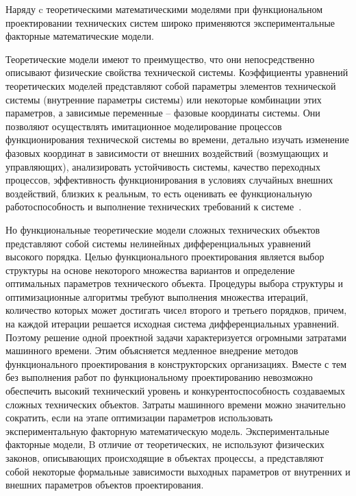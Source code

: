 Наряду c теоретическими математическими моделями при
функциональном проектировании технических систем широко применяются
экспериментальные факторные математические модели.

Теоретические модели имеют то преимущество, что они непосредственно
описывают физические свойства технической системы. Коэффициенты
уравнений теоретических моделей представляют собой параметры элементов
технической системы (внутренние параметры системы) или некоторые
комбинации этих параметров, а зависимые переменные – фазовые координаты
системы. Они позволяют осуществлять имитационное моделирование процессов
функционирования технической системы во времени, детально изучать
изменение фазовых координат в зависимости от внешних воздействий
(возмущающих и управляющих), анализировать устойчивость системы, качество
переходных процессов, эффективность функционирования в условиях
случайных внешних воздействий, близких к реальным, то есть оценивать ее
функциональную работоспособность и выполнение технических требований к
системе~\cite{modeling:2004}.

Но функциональные теоретические модели сложных технических
объектов представляют собой системы нелинейных дифференциальных
уравнений высокого порядка. Целью функционального проектирования является
выбор структуры на основе некоторого множества вариантов и определение
оптимальных параметров технического объекта. Процедуры выбора структуры
и оптимизационные алгоритмы требуют выполнения множества итераций,
количество которых может достигать чисел второго и третьего порядков,
причем, на каждой итерации решается исходная система дифференциальных уравнений. Поэтому решение одной проектной задачи характеризуется
огромными затратами машинного времени. Этим объясняется медленное
внедрение методов функционального проектирования в конструкторских
организациях. Вместе с тем без выполнения работ по функциональному
проектированию невозможно обеспечить высокий технический уровень и
конкурентоспособность создаваемых сложных технических объектов. Затраты
машинного времени можно значительно сократить, если на этапе оптимизации
параметров использовать экспериментальную факторную математическую
модель. Экспериментальные факторные модели, B отличие от теоретических, не
используют физических законов, описывающих происходящие в объектах
процессы, а представляют собой некоторые формальные зависимости выходных
параметров от внутренних и внешних параметров объектов проектирования.

